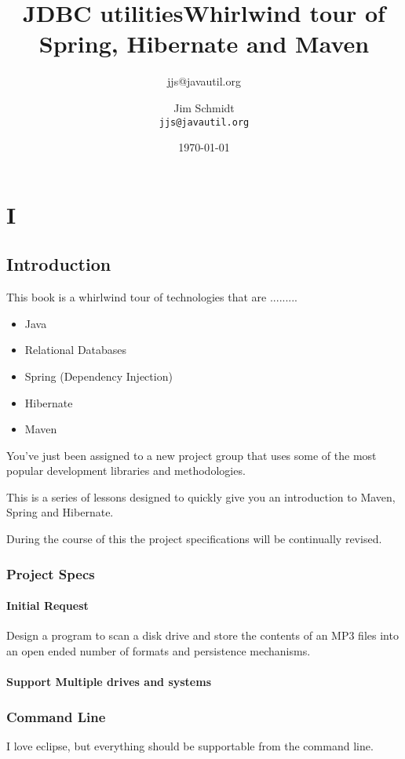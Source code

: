 \documentclass[a4paper,10pt]{book}
\title{JDBC utilities}
\author{jjs@javautil.org}
\begin{document}
\title{Whirlwind tour of Spring, Hibernate and Maven}
\author{Jim Schmidt\\
  \texttt{jjs@javautil.org}}
\date{\today}
\maketitle
\tableofcontents
\part{I}
\chapter{Introduction}
This book is a whirlwind tour of technologies that are .........

\begin{itemize}
 \item Java
 \item Relational Databases
 \item Spring (Dependency Injection)
 \item Hibernate
 \item Maven


\end{itemize}


You've just been assigned to a new project group that uses some of the most popular development libraries and 
methodologies.

This is a series of lessons designed to quickly give you an introduction to Maven, Spring and Hibernate.

During the course of this the project specifications will be continually revised.
\section{Project Specs}
\subsection{Initial Request}
Design a program to scan a disk drive and store the contents of an MP3 files into an open ended number of formats 
and persistence mechanisms.
\subsection{Support Multiple drives and systems}
\section{Command Line}
I love eclipse, but everything should be supportable from the command line.
\end{document}
